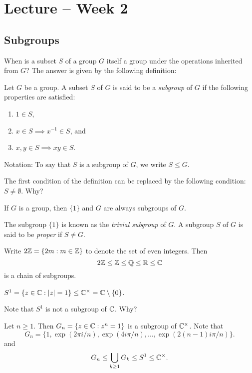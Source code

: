 \section{Lecture -- Week 2}

\subsection{Subgroups}

When is a subset $S$ of a group $G$ itself a group under the operations inherited from $G$? The answer is given by the following definition:

\begin{definition}
    Let $G$ be a group. 
        A subset $S$ of $G$ is said to be a \emph{subgroup} of $G$ 
        if the following properties are satisfied:
        \begin{enumerate}
                \item $1\in S$,
                \item $x\in S\implies x^{-1}\in S$, and 
                \item $x,y\in S\implies xy\in S$.
        \end{enumerate}
        Notation: To say that $S$ is a subgroup of $G$, we write $S\leq G$.
\end{definition}

The first condition of the definition can be replaced by
the following condition: $S\ne\emptyset$. Why? 

\begin{example}
    If $G$ is a group, then 
    $\{1\}$ and $G$ are always subgroups of $G$. 
\end{example}

The subgroup $\{1\}$ is known as the \emph{trivial subgroup} of $G$. 
A subgroup $S$ of $G$ is said to be \emph{proper} if $S\ne G$. 

\begin{example}
Write $2\mathbb{Z}=\{2m:m\in\mathbb{Z}\}$ to denote the set of even integers. Then 
\[
2\mathbb{Z}\leq\mathbb{Z}\leq\mathbb{Q}\leq\mathbb{R}\leq\mathbb{C}
\]
is a chain of subgroups. 
\end{example}

\begin{example}
$S^1=\{z\in\mathbb{C}:|z|=1\}\leq\mathbb{C}^\times=\mathbb{C}\setminus\{0\}$.
\end{example}

Note that $S^1$ is not a subgroup of $\mathbb{C}$. Why?

\begin{example}
Let $n\geq1$. Then $G_n=\{z\in\mathbb{C}:z^
n=1\}$ is a subgroup of $\mathbb{C}^\times$. 
Note that
\[
G_n=\{1,\exp(2\pi i/n),\exp(4i\pi/n),\dots,\exp(2(n-1)i\pi/n)\}.
\]
and 
\[
G_n\leq\bigcup_{k\geq1}G_k\leq S^1\leq\mathbb{C}^\times.
\]
\end{example}

